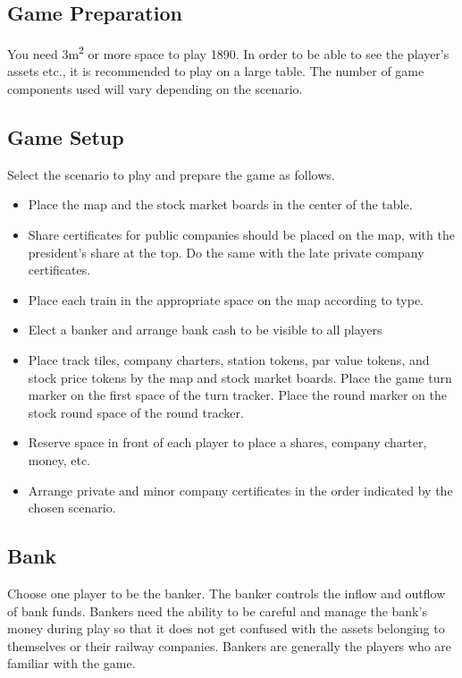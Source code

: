 \documentclass{article}
\begin{document}
\begin{CJK}{UTF8}{min}
\begin{multicols}{2}
\section{Game Preparation}

You need 3m\textsuperscript{2} or more space to play 1890. In order to
be able to see the player's assets etc., it is recommended to play on
a large table. The number of game components used will vary depending
on the scenario.


\subsection{Game Setup}
Select the scenario to play and prepare the game as follows.
\begin{itemize}
\item Place the map and the stock market boards in the center of the table.

\item Share certificates for public companies should be placed on the
  map, with the president's share at the top. Do the same with the
  late private company certificates.

\item Place each train in the appropriate space on the map according to type.

\item Elect a banker and arrange bank cash to be visible to all players

\item Place track tiles, company charters, station tokens, par
  value tokens, and stock price tokens by the map and stock market
  boards. Place the game turn marker on the first space of the turn
  tracker. Place the round marker on the stock round space of the
  round tracker.

\item Reserve space in front of each player to place a shares, company
  charter, money, etc.

\item Arrange private and minor company certificates in the order
  indicated by the chosen scenario.

\end{itemize}


\subsection{Bank}
Choose one player to be the banker. The banker controls the inflow and
outflow of bank funds. Bankers need the ability to be careful and
manage the bank's money during play so that it does not get confused
with the assets belonging to themselves or their railway companies. Bankers are
generally the players who are familiar with the game.


\end{multicols}
\end{CJK}
\end{document}
